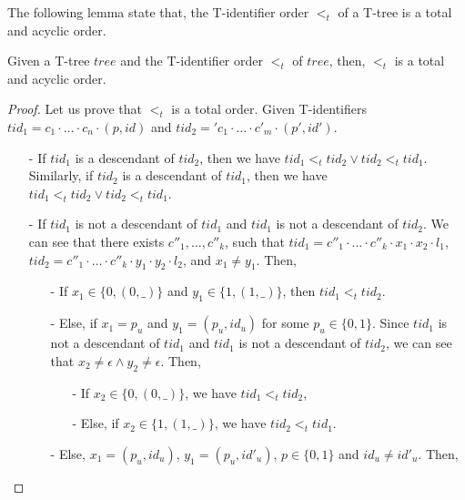 The following lemma state that, the T-identifier order $<_t$ of a T-tree is a total and acyclic order.

\begin{lemma}
\label{lemma:the <t order is a total and acyclic order}
Given a T-tree $tree$ and the T-identifier order $<_t$ of $tree$, then, $<_t$ is a total and acyclic order.
\end{lemma}

\begin {proof}
Let us prove that $<_t$ is a total order. Given T-identifiers $tid_1 = c_1 \cdot \ldots \cdot c_n \cdot (p,id)$ and $tid_2 = 'c_1 \cdot \ldots \cdot c'_m \cdot (p',id')$.

\begin{itemize}
\setlength{\itemsep}{0.5pt}
\item[-] If $tid_1$ is a descendant of $tid_2$, then we have $tid_1 <_t tid_2 \vee tid_2 <_t tid_1$. Similarly, if $tid_2$ is a descendant of $tid_1$, then we have $tid_1 <_t tid_2 \vee tid_2 <_t tid_1$.

\item[-] If $tid_1$ is not a descendant of $tid_1$ and $tid_1$ is not a descendant of $tid_2$. We can see that there exists $c''_1,\ldots,c''_k$, such that $tid_1 = c''_1 \cdot \ldots \cdot c''_k \cdot x_1 \cdot x_2 \cdot l_1$, $tid_2 = c''_1 \cdot \ldots \cdot c''_k \cdot y_1 \cdot y_2 \cdot l_2$, and $x_1 \neq y_1$. Then,

    \begin{itemize}
    \setlength{\itemsep}{0.5pt}
    \item[-] If $x_1 \in \{ 0, (0,\_) \}$ and $y_1 \in \{ 1, (1,\_) \}$, then $tid_1 <_t tid_2$.

    \item[-] Else, if $x_1=p_u$ and $y_1 = (p_u,id_u)$ for some $p_u \in \{ 0,1 \}$. Since $tid_1$ is not a descendant of $tid_1$ and $tid_1$ is not a descendant of $tid_2$, we can see that $x_2 \neq \epsilon \wedge y_2 \neq \epsilon$. Then,

        \begin{itemize}
        \setlength{\itemsep}{0.5pt}
        \item[-] If $x_2 \in \{ 0, (0,\_) \}$, we have $tid_1 <_t tid_2$,
        \item[-] Else, if $x_2 \in \{ 1, (1,\_) \}$, we have $tid_2 <_t tid_1$.
        \end{itemize}

    \item[-] Else, $x_1 = (p_u,id_u)$, $y_1 = (p_u,id'_u)$, $p \in \{0,1 \}$ and $id_u \neq id'_u$. Then,


\end{itemize}
\end{itemize}
\end{proof}
